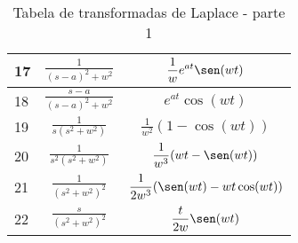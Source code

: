 \begin{table}
\begin{small}
\begin{center}
{{\begin{tabular}{|l|c|c|}
\hline 
17& $\displaystyle \frac{1}{(s-a)^2+w^2} $&$\displaystyle  \frac{1}{w}e^{at}\sen(wt)$ \\[1ex] 
\hline 
18& $\displaystyle \frac{s-a}{(s-a)^2+w^2} $&$\displaystyle  e^{at}\cos(wt)$ \\[1ex] 
\hline
 19& $\displaystyle \frac{1}{s(s^2+w^2)} $&$\displaystyle  \frac{1}{w^2}(1-\cos(wt))$ \\[1ex] 
\hline
20& $\displaystyle \frac{1}{s^2(s^2+w^2)} $&$\displaystyle  \frac{1}{w^3}(wt-\sen(wt))$ \\[1ex] 
\hline
21& $\displaystyle \frac{1}{(s^2+w^2)^2} $&$\displaystyle  \frac{1}{2w^3}(\sen(wt)-wt\cos(wt))$ \\[1ex] 
\hline
22& $\displaystyle \frac{s}{(s^2+w^2)^2} $&$\displaystyle  \frac{t}{2w}\sen(wt)$ \\[1ex] 
\hline
\end{tabular}} }
\caption{\label{tab_trans_Lap_1}Tabela de transformadas de Laplace - parte 1}
\end{center}
\end{small}
\end{table}	

